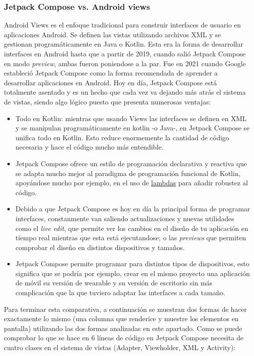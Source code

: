 \subsubsection{Jetpack Compose vs. Android views}
Android Views es el enfoque tradicional para construir interfaces de usuario en aplicaciones Android. Se definen las vistas  utilizando archivos XML y se gestionan programáticamente en Java o Kotlin. Esta era la forma de desarrollar interfaces en Android hasta que a partir de 2019, cuando salió Jetpack Compose en modo \textit{preview}, ambas fueron poniendose a la par. Fue en 2021 cuando Google estableció Jetpack Compose como la forma recomendada de aprender a desarrollar aplicaciones en Android. Hoy en día, Jetpack Compose está totalmente asentado y es un hecho que cada vez va dejando más atrás el sistema de vistas, siendo algo lógico puesto que presenta numerosas ventajas:
\begin{itemize}
    \item Todo en Kotlin: mientras que usando Views las interfaces se definen en XML y se manipulan programáticamente en kotlin -o Java-, en Jetpack Compose se unifica todo en Kotlin. Esto reduce enormemente la cantidad de código necesaria y hace el código mucho más entendible.
    \item Jetpack Compose ofrece un estilo de programación declarativa y reactiva que se adapta mucho mejor al paradigma de programación funcional de Kotlin, apoyándose mucho por ejemplo, en el uso de \href{https://kotlinlang.org/docs/lambdas.html}{lambdas} para añadir robustez al código.
    \item Debido a que Jetpack Compose es hoy en día la principal forma de programar interfaces, constanmente van saliendo actualizaciones y nuevas utilidades como el \textit{live edit}, que permite ver los cambios en el diseño de tu aplicación en tiempo real mientras que esta está ejecutandose; o las \textit{previews} que permiten comprobar el diseño en distintos dispositivos y tamaños.
    \item Jetpack Compose permite programar para distintos tipos de dispositivos, esto significa que se podría por ejemplo, crear en el mismo proyecto una aplicación de móvil su versión de wearable y su versión de escritorio sin más complicación que la que tuviero adaptar las interfaces a cada tamaño.
\end{itemize}
Para terminar esta comparativa, a continuación se muestran dos formas de hacer exactamente lo mismo (una columna que renderice y muestre los elementos en pantalla) utilizando las dos formas analizadas en este apartado. Como se puede comprobar lo que se hace en 6 líneas de código en Jetpack Compose necesita de cuatro clases en el sistema de vistas (Adapter, Viewholder, XML y Activity):
